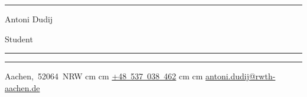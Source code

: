 \documentclass[11pt, letterpaper]{article}
\newenvironment{header}{
    \setlength{\topsep}{0pt}\par\kern\topsep\centering\linespread{0.3}
}{
    \par\kern\topsep
} %
\let\hrefWithoutArrow\href
\renewcommand{\href}[2]{\hrefWithoutArrow{#1}{\ifthenelse{\equal{#2}{}}{ }{#2 }\raisebox{.15ex}{\footnotesize \faExternalLink*}}}
\begin{document}
    \newcommand{\AND}{\unskip
        \cleaders\copy\ANDbox\hskip\wd\ANDbox
        \ignorespaces
    }
    \newsavebox\ANDbox
    \sbox\ANDbox{}

    \begin{header}
        \hrule
        \vspace{0.5cm}
        {\fontsize{30 pt}{30 pt}\selectfont Antoni Dudij}

        \vspace{0.2cm}
        {\fontsize{18 pt}{18pt}\selectfont Student}

        \vspace{0.4cm} %
        \normalsize
        {\color{black}\rule{\textwidth}{0.1pt}}
        \vspace{0.035cm} %
        {\color{black}\rule{\textwidth}{0.1pt}}

        \vspace{0.4cm}

        \mbox{{\color{black}\footnotesize\faMapMarker*}\hspace*{0.13cm}Aachen, 52064 NRW}  cm \textbullet {} cm
        \mbox{\hrefWithoutArrow{tel:+48-537-038-462}{\color{black}{\footnotesize\faPhone*}\hspace*{0.13cm}+48 537 038 462}}  cm \textbullet {} cm
        \mbox{\hrefWithoutArrow{mailto:antoni.dudij@rwth-aachen.de}{\color{black}{\footnotesize\faEnvelope[regular]}\hspace*{0.13cm}antoni.dudij@rwth-aachen.de}}
    \end{header}

    \vspace{0.25 cm}


    
    
    
    
    
    
    
    
    
\end{document}
